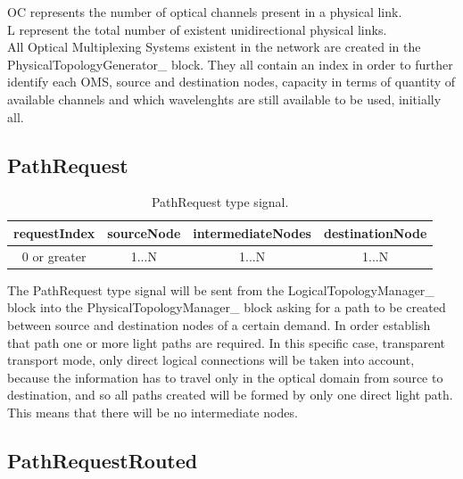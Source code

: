 OC represents the number of optical channels present in a physical link.\\
L represent the total number of existent unidirectional physical links.\\

All Optical Multiplexing Systems existent in the network are created in the PhysicalTopologyGenerator\_  block. They all contain an index in order to further identify each OMS, source and destination nodes, capacity in terms of quantity of available channels and which wavelenghts are still available to be used, initially all.

\subsection{PathRequest}

\begin{table}[H]
	\centering
	\begin{tabular}{|c|c|c|c|}
		\hline
		requestIndex & sourceNode & intermediateNodes & destinationNode\\ \hline
		0 or greater & 1...N      & 1...N             & 1...N          \\ \hline
	\end{tabular}
	\caption{PathRequest type signal.}
	\label{PathRequest}
\end{table}

The PathRequest type signal will be sent from the LogicalTopologyManager\_  block into the PhysicalTopologyManager\_  block asking for a path to be created between source and destination nodes of a certain demand. In order establish that path one or more light paths are required. In this specific case, transparent transport mode, only direct logical connections will be taken into account, because the information has to travel only in the optical domain from source to destination, and so all paths created will be formed by only one direct light path. This means that there will be no intermediate nodes. %



\subsection{PathRequestRouted}

